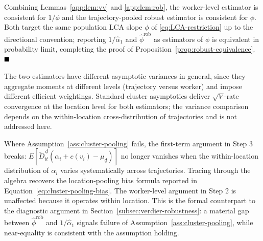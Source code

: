 Combining Lemmas~\ref{app:lem:vv} and \ref{app:lem:rob}, the worker-level estimator is consistent for $1/\phi$ and the trajectory-pooled robust estimator is consistent for $\phi$.
Both target the same population LCA slope $\phi$ of \eqref{eq:LCA-restriction} up to the directional convention; reporting $1/\hat\alpha_1$ and $\hat\phi^{\mathrm{rob}}$ as estimators of $\phi$ is equivalent in probability limit, completing the proof of Proposition~\ref{prop:robust-equivalence}. $\hfill\blacksquare$

The two estimators have different asymptotic variances in general, since they aggregate moments at different levels (trajectory versus worker) and impose different efficient weightings.
Standard cluster asymptotics deliver $\sqrt V$-rate convergence at the location level for both estimators; the variance comparison depends on the within-location cross-distribution of trajectories and is not addressed here.

Where Assumption~\ref{ass:cluster-pooling} fails, the first-term argument in Step 3 breaks: $E[\tilde D_{it}^{\,\underline d}(\alpha_i + c(v_i) - \mu_{\underline d})]$ no longer vanishes when the within-location distribution of $\alpha_i$ varies systematically across trajectories.
Tracing through the algebra recovers the location-pooling bias formula reported in Equation~\eqref{eq:cluster-pooling-bias}.
The worker-level argument in Step 2 is unaffected because it operates within location.
This is the formal counterpart to the diagnostic argument in Section~\ref{subsec:verdier-robustness}: a material gap between $\hat\phi^{\mathrm{rob}}$ and $1/\hat\alpha_1$ signals failure of Assumption~\ref{ass:cluster-pooling}, while near-equality is consistent with the assumption holding.
